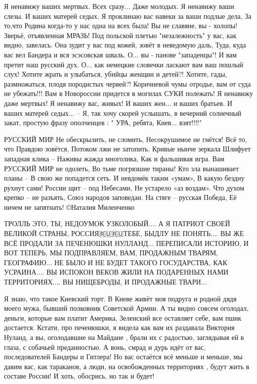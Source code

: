 Я ненавижу ваших мертвых. Всех сразу... Даже молодых.
Я ненавижу ваши слезы. И ваших матерей седых.
Я проклинаю вас навеки за ваши подлые дела,
За то,что Родина когда-то у нас одна на всех была!
Вы не славяне, вы - холопы! Зверьё, отъявленная МРАЗЬ!
Под польской плетью "незалежность" у вас, как видно, завелась.
Она зудит у вас под кожей, зовёт в неведомую даль,
Туда, куда вас вел Бандера и вся эсэсовская шваль.
О... вы - панове "западенцы"! И вам претит наш русский дух.
О... как немецкие словечки ласкают вам ваш пошлый слух!
Хотите жрать и улыбаться, убийцы женщин и детей?!
Хотите, гады, размножаться, плодя породистых червей?!
Коричневой чумы отродье, вам от суда не убежать!!!
Вам в Новороссии придется в могилах СУКИ полежать!
Я ненавижу даже мертвых! Я ненавижу вас, живых!
И ваших жен... и ваших братьев. И ваших матерей седых...
-- Я, так хочу скорей услышать,
в вечерний солнечный закат,
простую фразу ополченцев :
" УРА, ребята, Киев... взят!!!!"

РУССКИЙ МИР
Не обескрылить, не сломить,
Несокрушимое не гнётся!
Всё то, что Правдою зовётся,
Потоком лжи не затопить.
Кривые нынче зеркала
Шлифует западная клика –
Наживы жажда многолика,
Как и фальшивая игра.
Вам РУССКИЙ МИР не одолеть,
Во тьме погрязшие тираны!
Кто зла вынашивает планы –
В свою же попадется сеть.
И невдомёк таким «умам»,
В какую бездну рухнут сами!
России щит – под Небесами,
Не устарело «аз воздам».
Что духом крепко – не разъять,
Союз народов заповедан.
На стяге – русская Победа,
Её ничем не запятнать!
©Наталия Миленченко

ТРОЛЛЬ ЭТО, ТЫ, НЕДОУМОК УЗКОЛОБЫЙ.... А Я ПАТРИОТ СВОЕЙ ВЕЛИКОЙ СТРАНЫ,
РОССИЯ🇷🇺🇷🇺ТЕБЕ, БЫДЛУ НЕ ПОНЯТЬ.... ВЫ ЖЕ ВСЁ ПРОДАЛИ ЗА ПЕЧЕНЮШКИ
НУЛЛАНД... ПЕРЕПИСАЛИ ИСТОРИЮ, И ВОТ ТЕПЕРЬ, МЫ ПОДПРАВЛЯЕМ, ВАМ, ПРОДАЖНЫМ
ТВАРЯМ, ГЕОГРАФИЮ... НЕ БЫЛО И НЕ БУДЕТ ТАКОГО ГОСУДАРСТВА, КАК УСРАИНА.... ВЫ
ИСПОКОН ВЕКОВ ЖИЛИ НА ПОДАРЕННЫХ НАМИ ТЕРРИТОРИЯХ.... ВЫ НИЩЕБРОДЫ, И ПРОДАЖНЫЕ
ТВАРИ...

Я знаю, что такое Киевский торт. В Киеве живёт моя подруга и родной дядя моего
мужа, бывший  полковник Советской Армии. А ты видно совсем оголодал, деньги,
которые вам платит Америка, Зеленский все оставляет себе, вам пшик достается.
Кстати, про печенюшки, я видела как вам их раздавала Виктория Нуланд, а вы,
оголодавшие на  Майдане , брали их  с радостью, заглядывая ей в глаза, с
собачьей преданностью. А вонь, смрад и дурь идёт от вас, последователей Бандеры
и Гитлера! Но вас остаётся всё меньше и меньше, мы давим вас, как тараканов, а
люди, на освобожденных территориях , будут жить в  составе России! И хоть,
обосрись, но так и будет!


